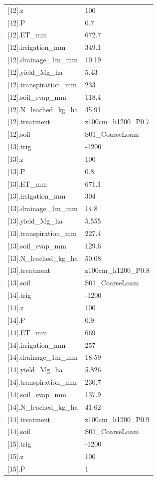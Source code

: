 {\begin{longtable}{p{}p{}}
{}[12].z & 100\\
{}[12].P & 0.7\\
{}[12].ET\_mm & 672.7\\
{}[12].irrigation\_mm & 349.1\\
{}[12].drainage\_1m\_mm & 10.19\\
{}[12].yield\_Mg\_ha & 5.43\\
{}[12].transpiration\_mm & 233\\
{}[12].soil\_evap\_mm & 118.4\\
{}[12].N\_leached\_kg\_ha & 45.91\\
{}[12].treatment & z100cm\_h1200\_P0.7\\
{}[12].soil & S01\_CoarseLoam\\
{}[13].trig & -1200\\
{}[13].z & 100\\
{}[13].P & 0.8\\
{}[13].ET\_mm & 671.1\\
{}[13].irrigation\_mm & 304\\
{}[13].drainage\_1m\_mm & 14.8\\
{}[13].yield\_Mg\_ha & 5.555\\
{}[13].transpiration\_mm & 227.4\\
{}[13].soil\_evap\_mm & 129.6\\
{}[13].N\_leached\_kg\_ha & 50.08\\
{}[13].treatment & z100cm\_h1200\_P0.8\\
{}[13].soil & S01\_CoarseLoam\\
{}[14].trig & -1200\\
{}[14].z & 100\\
{}[14].P & 0.9\\
{}[14].ET\_mm & 669\\
{}[14].irrigation\_mm & 257\\
{}[14].drainage\_1m\_mm & 18.59\\
{}[14].yield\_Mg\_ha & 5.826\\
{}[14].transpiration\_mm & 230.7\\
{}[14].soil\_evap\_mm & 137.9\\
{}[14].N\_leached\_kg\_ha & 41.62\\
{}[14].treatment & z100cm\_h1200\_P0.9\\
{}[14].soil & S01\_CoarseLoam\\
{}[15].trig & -1200\\
{}[15].z & 100\\
{}[15].P & 1\\

\end{longtable}}
